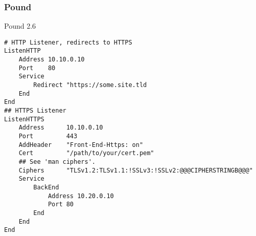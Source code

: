 \subsubsection{Pound}

Pound 2.6
	
\begin{lstlisting}[breaklines]
# HTTP Listener, redirects to HTTPS
ListenHTTP
    Address 10.10.0.10
    Port    80
    Service
        Redirect "https://some.site.tld
    End
End
## HTTPS Listener
ListenHTTPS
    Address      10.10.0.10
    Port         443
    AddHeader    "Front-End-Https: on"
    Cert         "/path/to/your/cert.pem"
    ## See 'man ciphers'.
    Ciphers      "TLSv1.2:TLSv1.1:!SSLv3:!SSLv2:@@@CIPHERSTRINGB@@@"
    Service
        BackEnd
            Address 10.20.0.10
            Port 80
        End
    End
End
\end{lstlisting}
